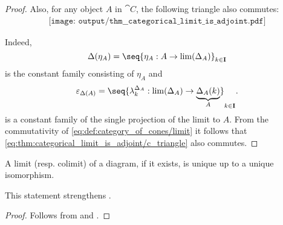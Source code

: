 \begin{proof}
  Also, for any object \( A \) in \( \cat{C} \), the following triangle also commutes:
  \begin{equation}\label{eq:thm:categorical_limit_is_adjoint/c_triangle}
    \begin{aligned}
      \texttt{[image: output/thm\_\_categorical\_limit\_is\_adjoint.pdf]}
    \end{aligned}
  \end{equation}

  Indeed,
  \begin{equation*}
    \Delta(\eta_A) = \seq{ \eta_A: A \to \lim(\Delta_A) }_{k \in \cat{I}}
  \end{equation*}
  is the constant family consisting of \( \eta_A \) and
  \begin{equation*}
    \varepsilon_{\Delta(A)} = \seq{ \lambda_k^{\Delta_A}: \lim(\Delta_A) \to \underbrace{\Delta_A(k)}_{A} }_{k \in \cat{I}}.
  \end{equation*}
  is a constant family of the single projection of the limit to \( A \). From the commutativity of \eqref{eq:def:category_of_cones/limit} it follows that \eqref{eq:thm:categorical_limit_is_adjoint/c_triangle} also commutes.
\end{proof}

\begin{corollary}\label{thm:categorical_limit_uniqueness}
  A limit (resp. colimit) of a diagram, if it exists, is unique up to a unique isomorphism.

  This statement strengthens .
\end{corollary}
\begin{proof}
  Follows from  and .
\end{proof}

